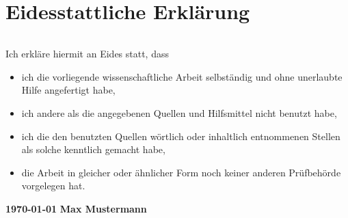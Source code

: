 \section*{Eidesstattliche Erklärung}
\thispagestyle{empty}

\begin{verbatim}
\end{verbatim}

Ich erkläre hiermit an Eides statt, dass

\begin{itemize}
	\item ich die vorliegende wissenschaftliche Arbeit selbständig und ohne unerlaubte Hilfe angefertigt habe,
	\item ich andere als die angegebenen Quellen und Hilfsmittel nicht benutzt habe,
	\item ich die den benutzten Quellen wörtlich oder inhaltlich entnommenen Stellen als solche kenntlich gemacht habe,
	\item die Arbeit in gleicher oder ähnlicher Form noch keiner anderen Prüfbehörde vorgelegen hat.
\end{itemize}

\vspace{5cm}
\textbf{\today}
\hspace{7cm}
\textbf{Max Mustermann}

